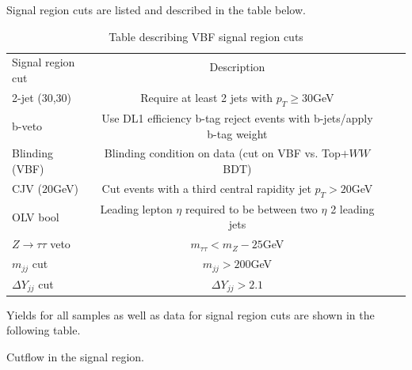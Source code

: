 Signal region cuts are listed and described in the table below.  

\begin{table}[h!]
\centering
\small{
\begin{tabular}{|l|c|c|c|}
\hline
\multirow{2}{*}{Signal region cut}   & Description \\
					&	\\
\hline
2-jet (30,30)           & Require at least 2 jets with $p_T \geq 30$GeV\\
b-veto      		& Use DL1 efficiency b-tag reject events with b-jets/apply b-tag weight \\
Blinding (VBF)          & Blinding condition on data (cut on VBF vs. Top$+WW$ BDT) \\
CJV ($20$GeV)		& Cut events with a third central rapidity jet $p_T > 20$GeV \\
OLV bool	        & Leading lepton $\eta$ required to be between two $\eta$ 2 leading jets \\
$Z\rightarrow\tau\tau$ veto & $m_{\tau\tau} < m_Z - 25$GeV \\ 
$m_{jj}$ cut		& $m_{jj} > 200$GeV \\
$\Delta Y_{jj}$ cut	& $\Delta Y_{jj} > 2.1$ \\
\hline
\end{tabular}
\caption{Table describing VBF signal region cuts}
\label{tab:SRdef}
}
\end{table}

Yields for all samples as well as data for signal region cuts are shown in the following table.
\begin{table}[h!]
\scalebox{0.35}{

}
\caption{Cutflow in the signal region.}
\label{tab:srcut}
\end{table}

